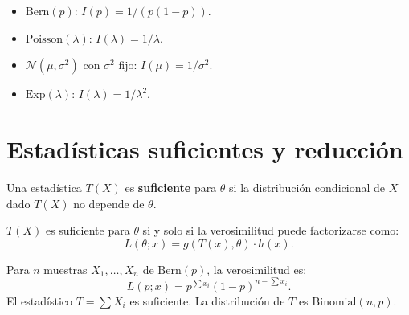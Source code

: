 \begin{example}
	\begin{itemize}
		\item $\mathrm{Bern}(p)$: $I(p) = 1/(p(1-p))$.
		\item $\mathrm{Poisson}(\lambda)$: $I(\lambda) = 1/\lambda$.
		\item $\mathcal{N}(\mu, \sigma^2)$ con $\sigma^2$ fijo: $I(\mu) = 1/\sigma^2$.
		\item $\mathrm{Exp}(\lambda)$: $I(\lambda) = 1/\lambda^2$.
	\end{itemize}
\end{example}

\begin{center}
\end{center}

\section{Estadísticas suficientes y reducción}

\begin{definition}
	Una estadística $T(X)$ es \textbf{suficiente} para $\theta$ si la distribución condicional de $X$ dado $T(X)$ no depende de $\theta$.
\end{definition}

\begin{theorem}
	$T(X)$ es suficiente para $\theta$ si y solo si la verosimilitud puede factorizarse como:
	\[
	L(\theta; x) = g(T(x), \theta) \cdot h(x).
	\]
\end{theorem}

\begin{example}
	Para $n$ muestras $X_1, \ldots, X_n$ de $\mathrm{Bern}(p)$, la verosimilitud es:
	\[
	L(p; x) = p^{\sum x_i}(1-p)^{n-\sum x_i}.
	\]
	El estadístico $T = \sum X_i$ es suficiente.  La distribución de $T$ es $\mathrm{Binomial}(n, p)$.
\end{example}

